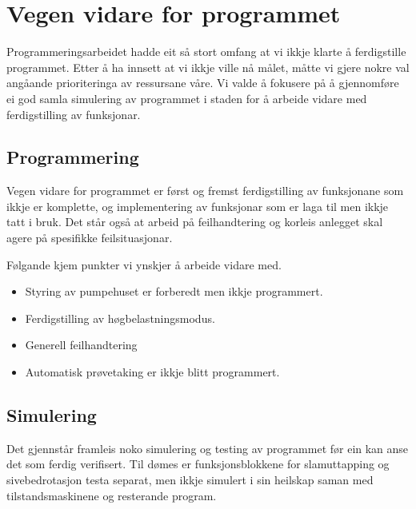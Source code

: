 \section{Vegen vidare for programmet}
\thispagestyle{fancy}

Programmeringsarbeidet hadde eit så stort omfang at vi ikkje klarte å ferdigstille programmet.
Etter å ha innsett at vi ikkje ville nå målet, måtte vi gjere nokre val angåande prioriteringa av ressursane våre. 
Vi valde å fokusere på å gjennomføre ei god samla simulering av programmet i staden for å arbeide vidare med ferdigstilling av funksjonar.

\subsection{Programmering}

Vegen vidare for programmet er først og fremst ferdigstilling av funksjonane som ikkje er komplette, og 
implementering av funksjonar som er laga til men ikkje tatt i bruk. 
Det står også at arbeid på feilhandtering og korleis anlegget skal agere på spesifikke feilsituasjonar.

Følgande kjem punkter vi ynskjer å arbeide vidare med.

\begin{itemize}
    \item Styring av pumpehuset er forberedt men ikkje programmert. 
    \item Ferdigstilling av høgbelastningsmodus.
    \item Generell feilhandtering
    \item Automatisk prøvetaking er ikkje blitt programmert.
\end{itemize}



\subsection{Simulering}

Det gjennstår framleis noko simulering og testing av programmet før ein kan anse det som ferdig verifisert.
Til dømes er funksjonsblokkene for slamuttapping og sivebedrotasjon testa separat, men ikkje simulert i sin heilskap saman med
tilstandsmaskinene og resterande program.

